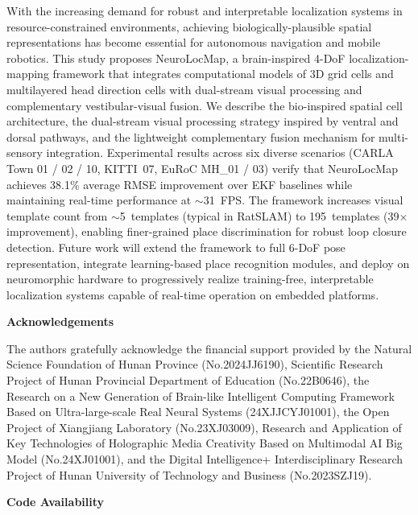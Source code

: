 \documentclass[twocolumn,journal]{IEEEtran}
\begin{document}
With the increasing demand for robust and interpretable localization systems in resource-constrained environments, achieving biologically-plausible spatial representations has become essential for autonomous navigation and mobile robotics. This study proposes NeuroLocMap, a brain-inspired 4-DoF localization-mapping framework that integrates computational models of 3D grid cells and multilayered head direction cells with dual-stream visual processing and complementary vestibular-visual fusion. We describe the bio-inspired spatial cell architecture, the dual-stream visual processing strategy inspired by ventral and dorsal pathways, and the lightweight complementary fusion mechanism for multi-sensory integration. Experimental results across six diverse scenarios (CARLA Town 01 / 02 / 10, KITTI~07, EuRoC MH\_01 / 03) verify that NeuroLocMap achieves 38.1\% average RMSE improvement over EKF baselines while maintaining real-time performance at $\sim$31~FPS. The framework increases visual template count from $\sim$5~templates (typical in RatSLAM) to 195~templates (39$\times$ improvement), enabling finer-grained place discrimination for robust loop closure detection. Future work will extend the framework to full 6-DoF pose representation, integrate learning-based place recognition modules, and deploy on neuromorphic hardware to progressively realize training-free, interpretable localization systems capable of real-time operation on embedded platforms.

\vspace{2em}

\noindent \textbf{Acknowledgements}
\vspace{1em}

The authors gratefully acknowledge the financial support provided by the Natural Science Foundation of Hunan Province (No.2024JJ6190), Scientific Research Project of Hunan Provincial Department of Education (No.22B0646), the Research on a New Generation of Brain-like Intelligent Computing Framework Based on Ultra-large-scale Real Neural Systems (24XJJCYJ01001), the Open Project of Xiangjiang Laboratory (No.23XJ03009), Research and Application of Key Technologies of Holographic Media Creativity Based on Multimodal AI Big Model (No.24XJ01001), and the Digital Intelligence+ Interdisciplinary Research Project of Hunan University of Technology and Business (No.2023SZJ19).

\vspace{1em}
\noindent \textbf{Code Availability}
\vspace{0.5em}
\end{document}
